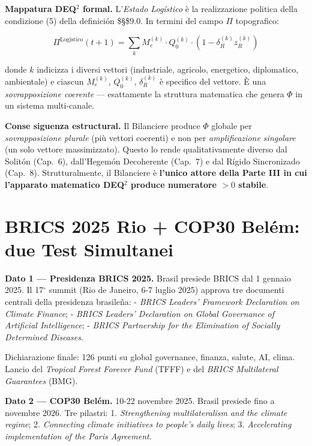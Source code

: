 \Proved{} \textbf{Mappatura DEQ$^2$ formal.} L'\emph{Estado Logístico} è
la realizzazione politica della condizione (5) della definición
\$\S\$9.0. In termini del campo \(\Pi\) topografico:

\[\Pi^{\text{Logístico}}(t+1) = \sum_{k} M_e^{(k)} \cdot Q_0^{(k)} \cdot (1 - \delta_R^{(k)} z_R^{(k)})\]

donde \(k\) indicizza i diversi vettori (industriale, agricolo,
energetico, diplomatico, ambientale) e ciascun \(M_e^{(k)}\),
\(Q_0^{(k)}\), \(\delta_R^{(k)}\) è specifico del vettore. È una
\emph{sovrapposizione coerente} --- esattamente la struttura matematica
che genera \(\Phi\) in un sistema multi-canale.

\Hypoth{} \textbf{Conse siguenza estructural.} Il Bilanciere produce
\(\Phi\) globale per \emph{sovrapposizione plurale} (più vettori
coerenti) e non per \emph{amplificazione singolare} (un solo vettore
massimizzato). Questo lo rende qualitativamente diverso dal Solitón
(Cap.~6), dall'Hegemón Decoherente (Cap.~7) e dal Rígido Sincronizado
(Cap.~8). Strutturalmente, il Bilanciere è \textbf{l'unico attore della
Parte III in cui l'apparato matematico DEQ$^2$ produce numeratore \(> 0\)
stabile}.



\section{BRICS 2025 Rio + COP30 Belém: due Test
Simultanei}\label{brics-2025-rio-cop30-beluxe9m-due-test-simultanei}

\Proved{} \textbf{Dato 1 --- Presidenza BRICS 2025.} Brasil presiede
BRICS dal 1 gennaio 2025. Il 17$^\circ$ summit (Rio de Janeiro, 6-7 luglio
2025) approva tre documenti centrali della presidenza brasileña: -
\emph{BRICS Leaders' Framework Declaration on Climate Finance}; -
\emph{BRICS Leaders' Declaration on Global Governance of Artificial
Intelligence}; - \emph{BRICS Partnership for the Elimination of Socially
Determined Diseases}.

Dichiarazione finale: 126 punti su global governance, finanza, salute,
AI, clima. Lancio del \emph{Tropical Forest Forever Fund} (TFFF) e del
\emph{BRICS Multilateral Guarantees} (BMG).

\Proved{} \textbf{Dato 2 --- COP30 Belém.} 10-22 novembre 2025. Brasil
presiede fino a novembre 2026. Tre pilastri: 1. \emph{Strengthening
multilateralism and the climate regime}; 2. \emph{Connecting climate
initiatives to people's daily lives}; 3. \emph{Accelerating
implementation of the Paris Agreement}.

